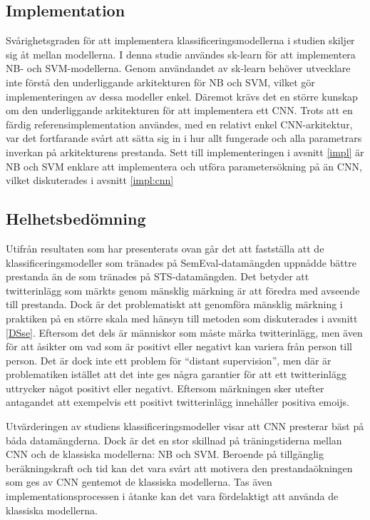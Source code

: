 \documentclass{kaumasters} %
\begin{document}
\subsection{Implementation}
Svårighetsgraden för att implementera klassificeringsmodellerna i studien skiljer sig åt mellan modellerna. I denna studie användes sk-learn för att implementera NB- och SVM-modellerna. Genom användandet av sk-learn behöver utvecklare inte förstå den underliggande arkitekturen för NB och SVM, vilket gör implementeringen av dessa modeller enkel. Däremot krävs det en större kunskap om den underliggande arkitekturen för att implementera ett CNN. Trots att en färdig referensimplementation användes, med en relativt enkel CNN-arkitektur, var det fortfarande svårt att sätta sig in i hur allt fungerade och alla parametrars inverkan på arkitekturens prestanda. Sett till implementeringen i avsnitt \ref{impl} är NB och SVM enklare att implementera och utföra parametersökning på än CNN, vilket diskuterades i avsnitt \ref{impl:cnn}
\subsection{Helhetsbedömning} \label{res:hhb}
Utifrån resultaten som har presenterats ovan går det att fastställa att de klassificeringsmodeller som tränades på SemEval-datamängden uppnådde bättre prestanda än de som tränades på STS-datamängden. Det betyder att twitterinlägg som märkts genom mänsklig märkning är att föredra med avseende till prestanda. Dock är det problematiskt att genomföra mänsklig märkning i praktiken på en större skala med hänsyn till metoden som diskuterades i avsnitt \ref{DSse}. Eftersom det dels är människor som måste märka twitterinlägg, men även för att åsikter om vad som är positivt eller negativt kan variera från person till person. Det är dock inte ett problem för “distant supervision”, men där är problematiken istället att det inte ges några garantier för att ett twitterinlägg uttrycker något positivt eller negativt. Eftersom märkningen sker utefter antagandet att exempelvis ett positivt twitterinlägg innehåller positiva emoijs.

Utvärderingen av studiens klassificeringsmodeller visar att CNN presterar bäst på båda datamängderna. Dock är det en stor skillnad på träningstiderna mellan CNN och de klassiska modellerna: NB och SVM. Beroende på tillgänglig beräkningskraft och tid kan det vara svårt att motivera den prestandaökningen som ges av CNN gentemot de klassiska modellerna. Tas även implementationsprocessen i åtanke kan det vara fördelaktigt att använda de klassiska modellerna.
\end{document}
